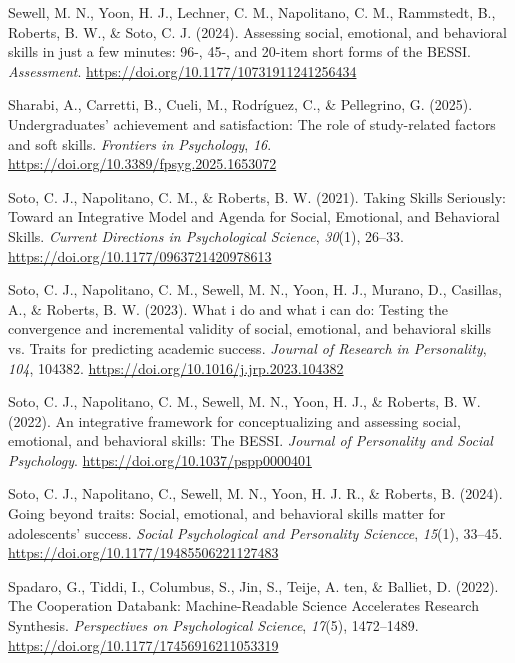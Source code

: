 \documentclass[
  man,
  longtable,
  nolmodern,
  notxfonts,
  notimes,
  colorlinks=true,linkcolor=blue,citecolor=blue,urlcolor=blue]{apa7}
\newlength{\cslhangindent}
\newenvironment{CSLReferences}[2] %
 {\begin{list}{}{%
  \setlength{\itemindent}{0pt}
  \setlength{\leftmargin}{0pt}
  \setlength{\parsep}{0pt}
  \ifodd #1
   \setlength{\leftmargin}{\cslhangindent}
   \setlength{\itemindent}{-1\cslhangindent}
  \fi
  \setlength{\itemsep}{#2\baselineskip}}}
 {\end{list}}
\begin{document}
\begin{CSLReferences}{1}{0}
Sewell, M. N., Yoon, H. J., Lechner, C. M., Napolitano, C. M.,
Rammstedt, B., Roberts, B. W., \& Soto, C. J. (2024). Assessing social,
emotional, and behavioral skills in just a few minutes: 96-, 45-, and
20-item short forms of the BESSI. \emph{Assessment}.
\url{https://doi.org/10.1177/10731911241256434}

Sharabi, A., Carretti, B., Cueli, M., Rodríguez, C., \& Pellegrino, G.
(2025). Undergraduates{'} achievement and satisfaction: The role of
study-related factors and soft skills. \emph{Frontiers in Psychology},
\emph{16}. \url{https://doi.org/10.3389/fpsyg.2025.1653072}

Soto, C. J., Napolitano, C. M., \& Roberts, B. W. (2021). Taking Skills
Seriously: Toward an Integrative Model and Agenda for Social, Emotional,
and Behavioral Skills. \emph{Current Directions in Psychological
Science}, \emph{30}(1), 26--33.
\url{https://doi.org/10.1177/0963721420978613}

Soto, C. J., Napolitano, C. M., Sewell, M. N., Yoon, H. J., Murano, D.,
Casillas, A., \& Roberts, B. W. (2023). What i do and what i can do:
Testing the convergence and incremental validity of social, emotional,
and behavioral skills vs. Traits for predicting academic success.
\emph{Journal of Research in Personality}, \emph{104}, 104382.
\url{https://doi.org/10.1016/j.jrp.2023.104382}

Soto, C. J., Napolitano, C. M., Sewell, M. N., Yoon, H. J., \& Roberts,
B. W. (2022). An integrative framework for conceptualizing and assessing
social, emotional, and behavioral skills: The BESSI. \emph{Journal of
Personality and Social Psychology}.
\url{https://doi.org/10.1037/pspp0000401}

Soto, C. J., Napolitano, C., Sewell, M. N., Yoon, H. J. R., \& Roberts,
B. (2024). Going beyond traits: Social, emotional, and behavioral skills
matter for adolescents' success. \emph{Social Psychological and
Personality Sciencce}, \emph{15}(1), 33--45.
\url{https://doi.org/10.1177/19485506221127483}

Spadaro, G., Tiddi, I., Columbus, S., Jin, S., Teije, A. ten, \&
Balliet, D. (2022). The Cooperation Databank: Machine-Readable Science
Accelerates Research Synthesis. \emph{Perspectives on Psychological
Science}, \emph{17}(5), 1472--1489.
\url{https://doi.org/10.1177/17456916211053319}


\end{CSLReferences}
\end{document}
